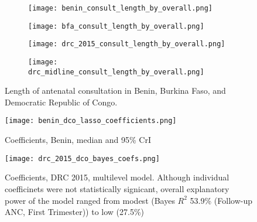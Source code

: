 \documentclass{article}
\begin{document}
\begin{figure}[p]
  \centering
  \begin{subfigure}[b]{0.45\textwidth}
    \texttt{[image: benin\_consult\_length\_by\_overall.png]}
    \subcaption{}
  \end{subfigure}   
  \hfill 
  \begin{subfigure}[b]{0.45\textwidth}
    \texttt{[image: bfa\_consult\_length\_by\_overall.png]}
    \subcaption{}
  \end{subfigure}

  \begin{subfigure}[b]{0.45\textwidth}
    \texttt{[image: drc\_2015\_consult\_length\_by\_overall.png]}
    \subcaption{}
  \end{subfigure}
  \hfill
  \begin{subfigure}[b]{0.45\textwidth}
    \texttt{[image: drc\_midline\_consult\_length\_by\_overall.png]}
    \subcaption{}
  \end{subfigure}   
  \caption{Length of antenatal consultation in Benin, Burkina Faso, and Democratic Republic of Congo.}
  \label{fig:anc length}
\end{figure}


\begin{figure}[p]
  \captionsetup{singlelinecheck=off}
  \centering
  \texttt{[image: benin\_dco\_lasso\_coefficients.png]}
  \caption{Coefficients, Benin, median and 95\% CrI}
  \label{fig:benin dco lm}
\end{figure}


\begin{figure}[p]
  \captionsetup{singlelinecheck=off}
  \centering
  \texttt{[image: drc\_2015\_dco\_bayes\_coefs.png]}
  \caption{Coefficients, DRC 2015, multilevel model. Although individual coefficinets were not statistically signicant, overall explanatory power of the model ranged from
    modest (Bayes $R^2$ 53.9\% (Follow-up ANC, First Trimester)) to low (27.5\%)}
  \label{fig:drc 2015 dco lm}
\end{figure} 
\end{document}
